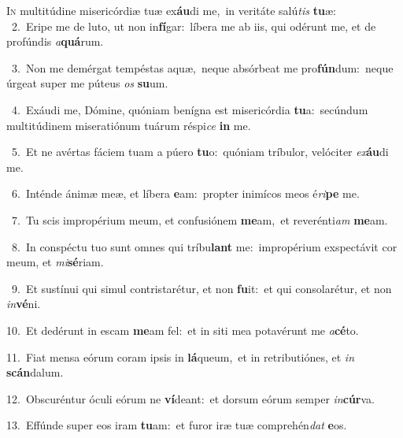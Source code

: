 \lettrine{\initial\textcolor{\initialcolor}{I}}{n} multitúdine misericórdiæ tuæ ex\-\textbf{áu}\-di me,~\star in veritáte salú\textit{tis} \textbf{tu}\-æ:\\
{\numbfont\textcolor{\numbcolor}{~2.}}~Eripe me de luto, ut non in\-\textbf{fí}\-gar:~\star líbera me ab iis, qui odérunt me, et de profúndis \textit{a}\-\textbf{quá}rum.\par
{\numbfont\textcolor{\numbcolor}{~3.}}~Non me demérgat tempéstas aquæ,~\dagger neque absórbeat me pro\-\textbf{fún}\-dum:~\star neque úrgeat super me púteus \textit{os} \textbf{su}\-um.\par
{\numbfont\textcolor{\numbcolor}{~4.}}~Exáudi me, Dómine, quóniam benígna est misericórdia \textbf{tu}\-a:~\star secúndum multitúdinem miseratiónum tuárum réspi\textit{ce} \textbf{in} me.\par
{\numbfont\textcolor{\numbcolor}{~5.}}~Et ne avértas fáciem tuam a púero \textbf{tu}\-o:~\star quóniam tríbulor, velóciter \textit{ex}\-\textbf{áu}di me.\par
{\numbfont\textcolor{\numbcolor}{~6.}}~Inténde ánimæ meæ, et líbera \textbf{e}\-am:~\star propter inimícos meos é\-\textit{ri}\-\textbf{pe} me.\par
{\numbfont\textcolor{\numbcolor}{~7.}}~Tu scis impropérium meum, et confusiónem \textbf{me}\-am,~\star et reverénti\textit{am} \textbf{me}\-am.\par
{\numbfont\textcolor{\numbcolor}{~8.}}~In conspéctu tuo sunt omnes qui tríbu\textbf{lant} me:~\star impropérium exspectávit cor meum, et \textit{mi}\-\textbf{sé}riam.\par
{\numbfont\textcolor{\numbcolor}{~9.}}~Et sustínui qui simul contristarétur, et non \textbf{fu}\-it:~\star et qui consolarétur, et non \textit{in}\-\textbf{vé}ni.\par
{\numbfont\textcolor{\numbcolor}{10.}}~Et dedérunt in escam \textbf{me}\-am fel:~\star et in siti mea potavérunt me \textit{a}\-\textbf{cé}to.\par
{\numbfont\textcolor{\numbcolor}{11.}}~Fiat mensa eórum coram ipsis in \textbf{lá}\-queum,~\star et in retributiónes, et \textit{in} \textbf{scán}\-dalum.\par
{\numbfont\textcolor{\numbcolor}{12.}}~Obscuréntur óculi eórum ne \textbf{ví}\-deant:~\star et dorsum eórum semper \textit{in}\-\textbf{cúr}va.\par
{\numbfont\textcolor{\numbcolor}{13.}}~Effúnde super eos iram \textbf{tu}\-am:~\star et furor iræ tuæ comprehén\textit{dat} \textbf{e}\-os.\par
